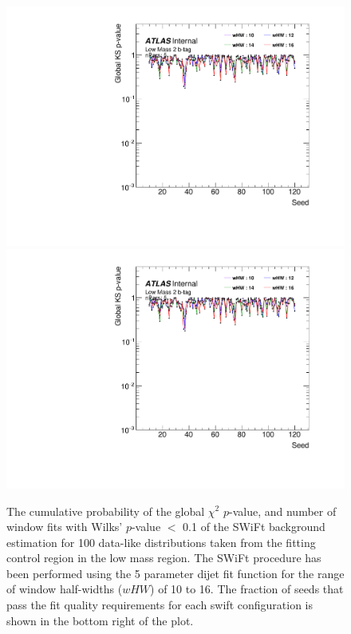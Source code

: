 \begin{figure}[!htb]
\captionsetup[subfigure]{aboveskip=0pt,justification=centering}
\centering
{} {
  \includegraphics[width=0.49\linewidth, angle=0,page=7]{figs/Dibjet/LowMass/FitStudy/windowSel_corrFitCR_dataLike_5para.pdf}
}  \hspace{-8mm}
 {
  \includegraphics[width=0.49\linewidth, angle=0,page=9]{figs/Dibjet/LowMass/FitStudy/windowSel_corrFitCR_dataLike_5para.pdf}
}
\vspace{10pt}
\caption{\label{fig:windowSel_dataLike}
  The cumulative probability of the global $\chi^{2}$ \mbox{$p$-value}, %
  and number of window fits with Wilks' \mbox{$p$-value} $<$ 0.1 of the SWiFt background estimation for
  100 data-like distributions taken from the fitting control region in the low mass region.
  The SWiFt procedure has been performed using the 5 parameter dijet fit function
  for the range of window half-widths ($wHW$) of 10 to 16.
  The fraction of seeds that pass the fit quality requirements for each swift configuration is shown in the bottom right of the plot.
}
\end{figure}

